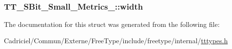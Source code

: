 \hypertarget{struct_t_t___s_bit___small___metrics___ad2401ae208b1663d0085ca06a04885fe}{
\subsubsection[{width}]{ T\-T\-\_\-\-S\-Bit\-\_\-\-Small\-\_\-\-Metrics\-\_\-\-::width}}\label{struct_t_t___s_bit___small___metrics___ad2401ae208b1663d0085ca06a04885fe}


The documentation for this struct was generated from the following file\-:\begin{DoxyCompactItemize}
\item 
Cadriciel/\-Commun/\-Externe/\-Free\-Type/include/freetype/internal/\hyperlink{tttypes_8h}{tttypes.\-h}\end{DoxyCompactItemize}

